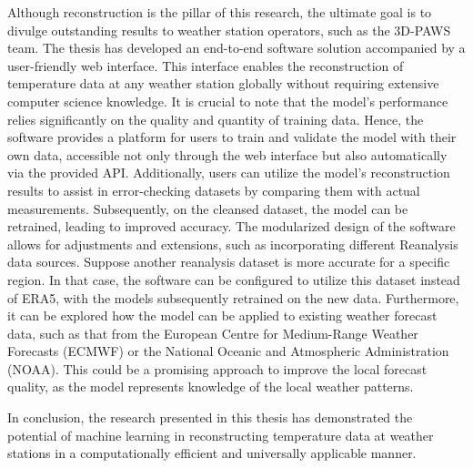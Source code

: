 Although reconstruction is the pillar of this research, the ultimate goal is to divulge outstanding results to weather station operators, such as the 3D-PAWS team.
The thesis has developed an end-to-end software solution accompanied by a user-friendly web interface.
This interface enables the reconstruction of temperature data at any weather station globally without requiring extensive computer science knowledge.
It is crucial to note that the model's performance relies significantly on the quality and quantity of training data.
Hence, the software provides a platform for users to train and validate the model with their own data, accessible not only through the web interface but also automatically via the provided API.
Additionally, users can utilize the model's reconstruction results to assist in error-checking datasets by comparing them with actual measurements.
Subsequently, on the cleansed dataset, the model can be retrained, leading to improved accuracy.
The modularized design of the software allows for adjustments and extensions, such as incorporating different Reanalysis data sources.
Suppose another reanalysis dataset is more accurate for a specific region. In that case, the software can be configured to utilize this dataset instead of ERA5, with the models subsequently retrained on the new data.
Furthermore, it can be explored how the model can be applied to existing weather forecast data, such as that from the European Centre for Medium-Range Weather Forecasts (ECMWF) or the National Oceanic and Atmospheric Administration (NOAA).
This could be a promising approach to improve the local forecast quality, as the model represents knowledge of the local weather patterns.

In conclusion, the research presented in this thesis has demonstrated the potential of machine learning in reconstructing temperature data at weather stations in a computationally efficient and universally applicable manner.
